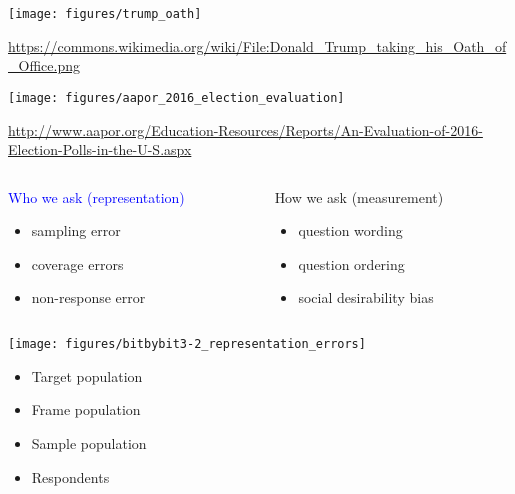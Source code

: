 \documentclass[aspectratio=169]{beamer}
\begin{document}
\begin{frame}

\begin{center}
\texttt{[image: figures/trump\_oath]}
\end{center}

\vfill
\tiny{\textcolor{blue}{\url{https://commons.wikimedia.org/wiki/File:Donald_Trump_taking_his_Oath_of_Office.png}}}

\end{frame}
\begin{frame}

\begin{center}
\texttt{[image: figures/aapor\_2016\_election\_evaluation]}
\end{center}

\vfill
\tiny{\url{http://www.aapor.org/Education-Resources/Reports/An-Evaluation-of-2016-Election-Polls-in-the-U-S.aspx}}

\end{frame}
\begin{frame}
\begin{columns}[T]

\begin{column}{0.48\textwidth}
\textcolor{blue}{
{\Large Who we ask} (representation)}\\
\begin{itemize}
\item sampling error
\item coverage errors
\item non-response error
\end{itemize}
\end{column}


\begin{column}{0.48\textwidth}
{\Large How we ask} (measurement)\\
\begin{itemize}
\item question wording
\item question ordering
\item social desirability bias
\end{itemize}
\end{column}

\end{columns}

\end{frame}
\begin{frame}

\begin{center}
\texttt{[image: figures/bitbybit3-2\_representation\_errors]}
\end{center}
\pause

\begin{itemize}
\item Target population
\pause
\item Frame population
\pause
\item Sample population
\pause
\item Respondents
\end{itemize}

\end{frame}
\end{document}
